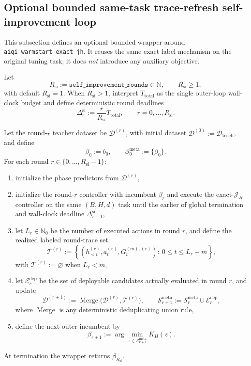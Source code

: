 \documentclass[11pt]{article}
\begin{document}
\subsection{Optional bounded same-task trace-refresh self-improvement loop}
\label{sec:aiqi-warmstart-self-improve}

This subsection defines an optional bounded wrapper around
\texttt{aiqi\_warmstart\_exact\allowbreak\_jh}. It reuses the same exact
label mechanism on the original tuning task; it does \emph{not} introduce any
auxiliary objective.

Let
\[
R_{\mathrm{si}}:=\texttt{self\_improvement\_rounds}\in\mathbb{N},
\qquad
R_{\mathrm{si}}\ge 1,
\]
with default $R_{\mathrm{si}}=1$.
When $R_{\mathrm{si}}>1$, interpret $T_{\mathrm{total}}$ as the single
outer-loop wall-clock budget and define deterministic round deadlines
\[
\Delta_r^{\mathrm{si}}:=\frac{r}{R_{\mathrm{si}}}T_{\mathrm{total}},
\qquad r=0,\dots,R_{\mathrm{si}}.
\]

Let the round-$r$ teacher dataset be $\mathcal{D}^{(r)}$, with initial dataset
$\mathcal{D}^{(0)}:=\mathcal{D}_{\mathrm{teach}}$, and define
\[
\beta_0:=b_0,
\qquad
\mathcal{S}_0^{\mathrm{meta}}:=\{\beta_0\}.
\]
For each round $r\in\{0,\dots,R_{\mathrm{si}}-1\}$:
\begin{enumerate}
    \item initialize the phase predictors from $\mathcal{D}^{(r)}$,
    \item initialize the round-$r$ controller with incumbent $\beta_r$ and
    execute the exact-$\mathcal{J}_H$ controller on the same $(B,H,d)$ task
    until the earlier of global termination and wall-clock deadline
    $\Delta_{r+1}^{\mathrm{si}}$,
    \item let $L_r\in\mathbb{N}_0$ be the number of executed actions in round
    $r$, and define the realized labeled round-trace set
    \[
    \mathcal{T}^{(r)}
    :=
    \left\{
    (h_{<t}^{(r)},a_t^{(r)},G_t^{(m),(r)}):\ 0\le t\le L_r-m
    \right\},
    \]
    with $\mathcal{T}^{(r)}:=\varnothing$ when $L_r<m$,
    \item let $\mathcal{E}_r^{\mathrm{dep}}$ be the set of deployable
    candidates actually evaluated in round $r$, and update
    \[
    \mathcal{D}^{(r+1)}:=\operatorname{Merge}\!\bigl(\mathcal{D}^{(r)},\mathcal{T}^{(r)}\bigr),
    \qquad
    \mathcal{S}_{r+1}^{\mathrm{meta}}:=\mathcal{S}_r^{\mathrm{meta}}\cup \mathcal{E}_r^{\mathrm{dep}},
    \]
    where $\operatorname{Merge}$ is any deterministic deduplicating union rule,
    \item define the next outer incumbent by
    \[
    \beta_{r+1}:=\arg\min_{z\in\mathcal{S}_{r+1}^{\mathrm{meta}}}K_H(z).
    \]
\end{enumerate}
At termination the wrapper returns $\beta_{R_{\mathrm{si}}}$.
\end{document}

